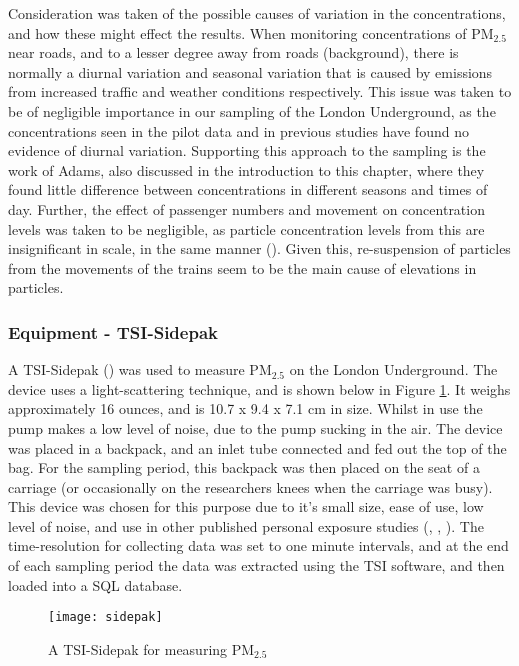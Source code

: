 Consideration was taken of the possible causes of variation in the concentrations, and how these might effect the results. When monitoring concentrations of PM$_{2.5}$ near roads, and to a lesser degree away from roads (background), there is normally a diurnal variation and seasonal variation that is caused by emissions from increased traffic and weather conditions respectively. This issue was taken to be of negligible importance in our sampling of the London Underground, as the concentrations seen in the pilot data and in previous studies have found no evidence of diurnal variation. Supporting this approach to the sampling is the work of Adams, also discussed in the introduction to this chapter, where they found little difference between concentrations in different seasons and times of day. Further, the effect of passenger numbers and movement on concentration levels was taken to be negligible, as particle concentration levels from this are insignificant in scale, in the same manner (\cite{Ferro2004a}). Given this, re-suspension of particles from the movements of the trains seem to be the main cause of elevations in particles.

\subsubsection{Equipment - TSI-Sidepak}
\label{sec:equipment_tsi_sidepak}

A TSI-Sidepak (\cite{TSI2015}) was used to measure PM$_{2.5}$ on the London Underground. The device uses a light-scattering technique, and is shown below in Figure \ref{fig:sidepak}. It weighs approximately 16 ounces, and is 10.7 x 9.4 x 7.1 cm in size. Whilst in use the pump makes a low level of noise, due to the pump sucking in the air. The device was placed in a backpack, and an inlet tube connected and fed out the top of the bag. For the sampling period, this backpack was then placed on the seat of a carriage (or occasionally on the researchers knees when the carriage was busy). This device was chosen for this purpose due to it's small size, ease of use, low level of noise, and use in other published personal exposure studies (\cite{Huang2015}, \cite{Han2015}, \cite{Yu2016}). The time-resolution for collecting data was set to one minute intervals, and at the end of each sampling period the data was extracted using the TSI software, and then loaded into a SQL database.

\begin{figure}[H]
\centering
\texttt{[image: sidepak]}
\caption{A TSI-Sidepak for measuring PM$_{2.5}$}
\label{fig:sidepak}
\end{figure}

